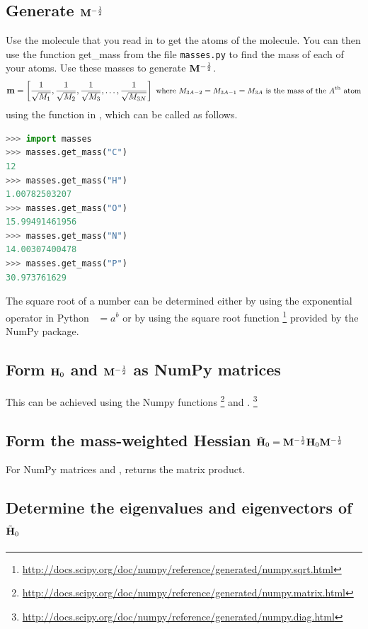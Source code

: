 \documentclass[11pt]{article}
\begin{document}
\subsection{Generate $\mathbf{M}^{-\frac{1}{2}}$}
Use the molecule that you read in to get the atoms of the molecule. You can
then use the function get\_mass from the file \texttt{masses.py} to find the
mass of each of your atoms. Use these masses to generate $\mathbf{M}^{-\frac{1}{2}}$.
\begin{align}
    \mathbf{m} = \left[\dfrac{1}{\sqrt{M_1}}, \dfrac{1}{\sqrt{M_2}}, \dfrac{1}{\sqrt{M_3}},
\ldots, \dfrac{1}{\sqrt{M_{3N}}} \right]
    \text{\small\ where $M_{3A-2} = M_{3A-1} = M_{3A}$ is the mass of the $A$\ensuremath{^\text{th}}\ atom}
\end{align}
using the  function in , which can be called as follows.
\begin{lstlisting}[language=python]
>>> import masses
>>> masses.get_mass("C")
12
>>> masses.get_mass("H")
1.00782503207
>>> masses.get_mass("O")
15.99491461956
>>> masses.get_mass("N")
14.00307400478
>>> masses.get_mass("P")
30.973761629
\end{lstlisting}
The square root of a number can be determined either by using the exponential
operator in Python ~$=a^b$ or by using the square root function
\footnote{\url{http://docs.scipy.org/doc/numpy/reference/generated/numpy.sqrt.html}}
provided by the NumPy package.

\subsection{Form $\mathbf{H}_0$ and $\mathbf{M}^{-\frac{1}{2}}$ as NumPy matrices}
This can be achieved using the Numpy functions 
\footnote{\url{http://docs.scipy.org/doc/numpy/reference/generated/numpy.matrix.html}}
and .
\footnote{\url{http://docs.scipy.org/doc/numpy/reference/generated/numpy.diag.html}}

\subsection{Form the mass-weighted Hessian $\tilde{\mathbf{H}}_0 = \mathbf{M}^{-\frac{1}{2}}\mathbf{H}_0\mathbf{M}^{-\frac{1}{2}}$}

For NumPy matrices  and ,  returns the matrix product.

\subsection{Determine the eigenvalues and eigenvectors of $\tilde{\mathbf{H}}_0$}
\end{document}
